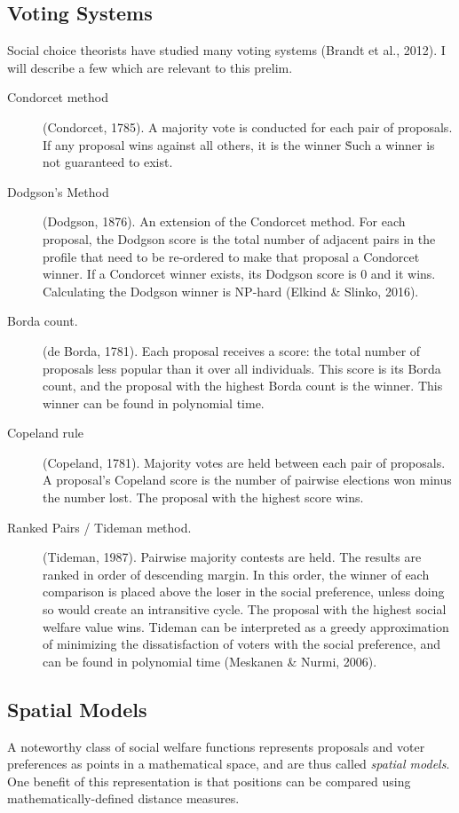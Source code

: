 \subsection{Voting Systems}
Social choice theorists have studied many voting systems (Brandt et al., 2012). I will describe a few which are relevant to this prelim.

\begin{description}
\item[Condorcet method]{(Condorcet, 1785).
A majority vote is conducted for each pair of proposals.
If any proposal wins against all others, it is the winner \.
Such a winner is not guaranteed to exist.}
\item[Dodgson's Method]{(Dodgson, 1876).
An extension of the Condorcet method.
For each proposal, the Dodgson score is the total number of adjacent pairs
in the profile that need to be re-ordered to make that proposal a Condorcet
winner.
If a Condorcet winner exists, its Dodgson score is 0 and it wins.
Calculating the Dodgson winner is NP-hard (Elkind \& Slinko, 2016).}
\item[Borda count.]{(de Borda, 1781). Each proposal receives a score:
the total number of proposals less popular than it over all individuals.
This score is its Borda count, and the proposal with the highest Borda count is
the winner. This winner can be found in polynomial time.}
\item[Copeland rule]{(Copeland, 1781).
Majority votes are held between each pair of proposals.
A proposal's Copeland score is the number of pairwise elections won minus
the number lost. The proposal with the highest score wins.}
\item[Ranked Pairs / Tideman method.]{(Tideman, 1987).
Pairwise majority contests are held.
The results are ranked in order of descending margin. In this order,
the winner of each comparison is placed above the loser in the social
preference, unless doing so would create an intransitive cycle.
The proposal with the highest social welfare value wins.
Tideman can be interpreted as a greedy approximation of minimizing the
dissatisfaction of voters with the social preference,
and can be found in polynomial time (Meskanen \& Nurmi, 2006).}
\end{description}

\subsection{Spatial Models}
A noteworthy class of social welfare functions represents proposals and voter preferences as points in a mathematical space, and are thus called {\em spatial models}. One benefit of this representation is that positions can be compared using mathematically-defined distance measures.


